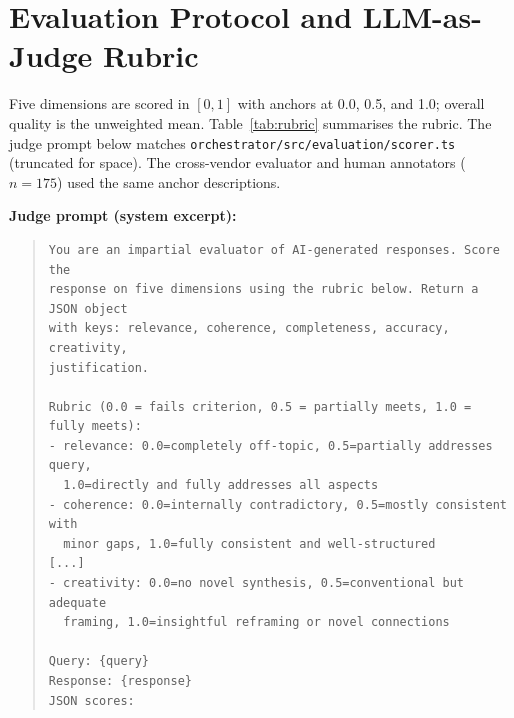 \documentclass{iopjournal}
\begin{document}
\section{Evaluation Protocol and LLM-as-Judge Rubric}
\label{app:rubric}

Five dimensions are scored in $[0,1]$ with anchors at 0.0, 0.5, and 1.0; overall quality is the unweighted mean. Table~\ref{tab:rubric} summarises the rubric. The judge prompt below matches \texttt{orchestrator/src/evaluation/scorer.ts} (truncated for space). The cross-vendor evaluator and human annotators ($n=175$) used the same anchor descriptions.

\begin{table}[H]
\centering
\caption{LLM-as-judge quality rubric (anchors per dimension)}
\label{tab:rubric}
\small
{}
\end{table}

\textbf{Judge prompt (system excerpt):}
\begin{quote}\small
\begin{verbatim}
You are an impartial evaluator of AI-generated responses. Score the
response on five dimensions using the rubric below. Return a JSON object
with keys: relevance, coherence, completeness, accuracy, creativity,
justification.

Rubric (0.0 = fails criterion, 0.5 = partially meets, 1.0 = fully meets):
- relevance: 0.0=completely off-topic, 0.5=partially addresses query,
  1.0=directly and fully addresses all aspects
- coherence: 0.0=internally contradictory, 0.5=mostly consistent with
  minor gaps, 1.0=fully consistent and well-structured
[...]
- creativity: 0.0=no novel synthesis, 0.5=conventional but adequate
  framing, 1.0=insightful reframing or novel connections

Query: {query}
Response: {response}
JSON scores:
\end{verbatim}
\end{quote}
\end{document}
